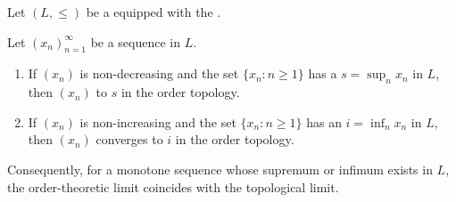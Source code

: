 \begin{proposition} \label{proposition:convergence_of_a_monotone_sequence_to_a_supremum_or_infimum_in_a_totally_ordered_set_coincides_with_topological_convergence_in_the_order_topology}
Let $(L, \leq)$ be a  equipped with the .

Let $(x_n)_{n=1}^\infty$ be a sequence in $L$.
\begin{enumerate}
    \item If $(x_n)$ is non-decreasing and the set $\{x_n : n \geq 1\}$ has a  $s = \sup_{n} x_n$ in $L$, then $(x_n)$  to $s$ in the order topology.

    \item If $(x_n)$ is non-increasing and the set $\{x_n : n \geq 1\}$ has an  $i = \inf_{n} x_n$ in $L$, then $(x_n)$ converges to $i$ in the order topology.
\end{enumerate}
Consequently, for a monotone sequence whose supremum or infimum exists in $L$, the order-theoretic limit coincides with the topological limit.
\end{proposition}
